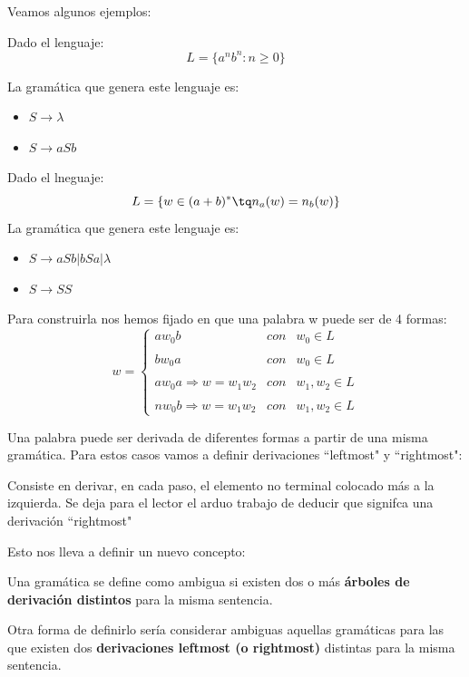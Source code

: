 \documentclass{apuntes}
\begin{document}
Veamos algunos ejemplos:

\begin{example}
Dado el lenguaje:
\[L = \lbrace a^n b^n : n\geq 0 \rbrace\]

La gramática que genera este lenguaje es:
\begin{itemize}
\item $S \rightarrow \lambda$
\item $S \rightarrow aSb$
\end{itemize}
\end{example}

\begin{example}
Dado el lneguaje:
\[L = \lbrace w \in (a+b)^* \tq n_a(w)=n_b(w)\rbrace\]
\newpage
La gramática que genera este lenguaje es:
\begin{itemize}
\item $S \rightarrow aSb | bSa | \lambda$
\item $S \rightarrow SS$
\end{itemize}

Para construirla nos hemos fijado en que una palabra w puede ser de 4 formas:
\[w = \left\{ \begin{array}{lcc}
             aw_0b &   con  & w_0 \in L \\
             \\ bw_0a &  con & w_0 \in L \\
             \\ aw_0a  \Rightarrow  w = w_1w_2  & con  & w_1,w_2 \in L\\
             \\ nw_0b  \Rightarrow  w = w_1w_2  &  con &  w_1,w_2 \in L
             \end{array}
   \right.\]
\end{example}

Una palabra puede ser derivada de diferentes formas a partir de una misma gramática. Para estos casos vamos a definir derivaciones ``leftmost" y ``rightmost":
\begin{defn}[Leftmost]
Consiste en derivar, en cada paso, el elemento no terminal colocado más a la izquierda. Se deja para el lector el arduo trabajo de deducir que signifca una derivación ``rightmost"
\end{defn}

Esto nos lleva a definir un nuevo concepto:

\begin{defn}[Ambigüedad]
Una gramática se define como ambigua si existen dos o más \textbf{árboles de derivación distintos} para la misma sentencia.

Otra forma de definirlo sería considerar ambiguas aquellas gramáticas para las que existen dos \textbf{derivaciones leftmost (o rightmost)} distintas para la misma sentencia.
\end{defn}
\end{document}

